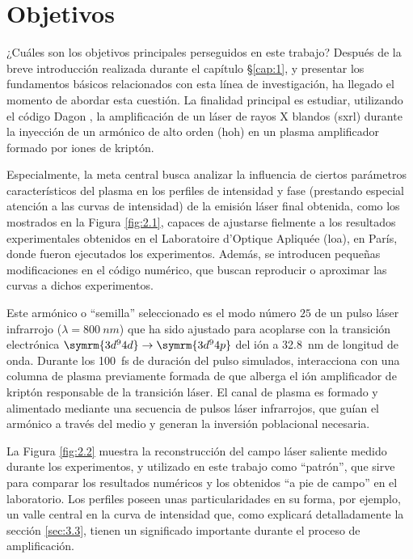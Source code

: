 \chapter{Objetivos}\label{cap:2}
¿Cuáles son los objetivos principales perseguidos en este trabajo? Después de la breve introducción realizada durante el capítulo \S\ref{cap:1}, y presentar los fundamentos básicos relacionados con esta línea de investigación, ha llegado el momento de abordar esta cuestión. La finalidad principal es estudiar, utilizando el código Dagon \autocite{Oliva2017}, la amplificación de un láser de rayos X blandos (\acrshort{sxrl}) durante la inyección de un armónico de alto orden (\acrshort{hoh}) en un plasma amplificador formado por iones de kriptón.

Especialmente, la meta central busca analizar la influencia de ciertos parámetros característicos del plasma en los perfiles de intensidad y fase (prestando especial atención a las curvas de intensidad) de la emisión láser final obtenida, como los mostrados en la Figura \ref{fig:2.1}, capaces de ajustarse fielmente a los resultados experimentales obtenidos en el Laboratoire d'Optique Apliquée (\acrshort{loa}), en París, donde fueron ejecutados los experimentos. Además, se introducen pequeñas modificaciones en el código numérico, que buscan reproducir o aproximar las curvas a dichos experimentos.

Este armónico o \enquote{semilla} seleccionado es el modo número $25$ de un pulso láser infrarrojo ($\lambda = \qty{800}{nm}$) que ha sido ajustado para acoplarse con la transición electrónica $\symrm{3d^{9}4d} \rightarrow \symrm{3d^{9}4p}$ del ión  a \qty{32.8}{nm} de longitud de onda. Durante los \qty{100}{fs} de duración del pulso simulados, interacciona con una columna de plasma previamente formada de  que alberga el ión amplificador de kriptón  responsable de la transición láser. El canal de plasma es formado y alimentado mediante una secuencia de pulsos láser infrarrojos, que guían el armónico a través del medio y generan la inversión poblacional necesaria.

La Figura \ref{fig:2.2} muestra la reconstrucción del campo láser saliente medido durante los experimentos, y utilizado en este trabajo como \enquote{patrón}, que sirve para comparar los resultados numéricos y los obtenidos \enquote{a pie de campo} en el laboratorio. Los perfiles poseen unas particularidades en su forma, por ejemplo, un valle central en la curva de intensidad que, como explicará detalladamente la sección \ref{sec:3.3}, tienen un significado importante durante el proceso de amplificación.

